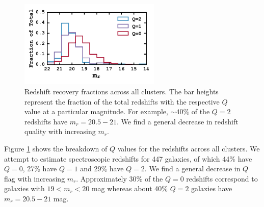 \begin{figure}[t]
	\begin{center}
		\includegraphics[width=0.6\textwidth]{figures2/redshiftHist.pdf}
	\end{center}
	\caption[Redshift recovery fractions across all clusters]{Redshift recovery fractions across all clusters. The bar heights represent the fraction of the total redshifts with the respective $Q$ value at a particular magnitude. For example, $\sim 40\%$ of the $Q=2$ redshifts have $m_r = 20.5-21$. We find a general decrease in redshift quality with increasing $m_r$. } 
	\label{2fig:redshiftHist} 
\end{figure}

Figure \ref{2fig:redshiftHist} shows the breakdown of $Q$ values for the redshifts across all clusters. We attempt to estimate spectroscopic redshifts for 447 galaxies, of which 44\% have $Q=0$, 27\% have $Q=1$ and 29\% have $Q=2$.  We find a general decrease in $Q$ flag with increasing $m_r$. Approximately 30\% of the $Q=0$ redshifts correspond to galaxies with $19 < m_r <20$ mag whereas about 40\% $Q=2$ galaxies have $m_r = 20.5-21$ mag.

